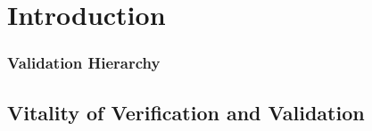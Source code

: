 % 

\section{Introduction}

\begin{frame}\frametitle{Validation Hierarchy}
	
\end{frame}

\subsection{Vitality of Verification and Validation}


\endinput  %
